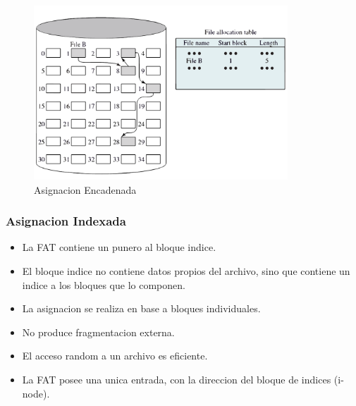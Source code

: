 \documentclass[12pt]{article}
\begin{document}
\begin{figure}[h]
    \begin{center}
        \includegraphics[width=0.85\textwidth]{assets/AsignacionEncadenada.pdf}
    \end{center}
    \caption{Asignacion Encadenada}
    \label{fig:2}
\end{figure}

\subsubsection{Asignacion Indexada}
\begin{itemize}
    \item La FAT contiene un punero al bloque indice.
    \item El bloque indice no contiene datos propios del archivo, sino que contiene un indice a los bloques que lo componen.
    \item La asignacion se realiza en base a bloques individuales.
    \item No produce fragmentacion externa.
    \item El acceso random a un archivo es eficiente.
    \item La FAT posee una unica entrada, con la direccion del bloque de indices (i-node).
\end{itemize}
\end{document}
